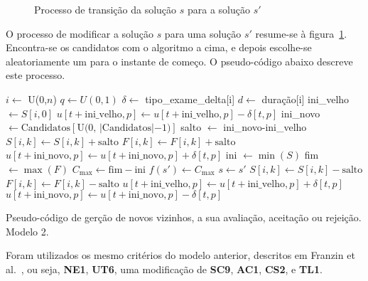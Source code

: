 \begin{figure}[H]
	\centering
	\caption{Processo de transição da solução $s$ para a solução $s'$}
	\label{fig:trans_P1M1_GV}
\end{figure}
O processo de modificar a solução $s$ para uma solução $s'$ resume-se à figura~\ref{fig:trans_P1M1_GV}. Encontra-se os candidatos com o algoritmo a cima, e depois escolhe-se aleatoriamente um para o instante de começo. O pseudo-código abaixo descreve este processo.\\
\begin{algorithm}[H]
    $i \gets$ U(0,$n$)\;
    $q \gets U(0,1)$\;
    $\delta \gets$ tipo\_exame\_delta[i]\;
    $d \gets$ duração[i]\;
    ini\_velho $\gets S[i, 0]$\;
	{
    	{
		$u[t+\text{ini\_velho}, p] \gets u[t+\text{ini\_velho}, p] - \delta[t, p]$\;
    	}
	}
	ini\_novo $\gets \text{Candidatos}[\text{U(0, |Candidatos}|-1)]$\;
    salto $\gets$ ini\_novo-ini\_velho\;
    {
    $S[i, k] \gets S[i, k]+ \text{salto}$\;
    $F[i, k] \gets F[i, k]+ \text{salto}$\;
    }
	{
    	{
		$u[t+\text{ini\_novo}, p] \gets u[t+\text{ini\_novo}, p] + \delta[t, p]$\;
    	}
	}
    ini $\gets \min(S)$\;
    fim $\gets \max(F)$\;
    $C_{\max} \gets \text{fim} - \text{ini}$\;
    $f(s') \gets C_{\max}$\;
	{
		$s \gets s'$
	}
	\Else
	{
    {
    $S[i, k] \gets S[i, k]- \text{salto}$\;
    $F[i, k] \gets F[i, k]- \text{salto}$\;
    }
	{
    	{
		$u[t+\text{ini\_velho}, p] \gets u[t+\text{ini\_velho}, p] + \delta[t, p]$\;
		$u[t+\text{ini\_novo}, p] \gets u[t+\text{ini\_novo}, p] - \delta[t, p]$\;
    	}
	}
	}
    \caption{Pseudo-código de gerção de novos vizinhos, a sua avaliação, aceitação ou rejeição. Modelo 2.}
\end{algorithm}

Foram utilizados os mesmo critérios do modelo anterior, descritos em Franzin et al.~\cite{franzinRevisitingSimulatedAnnealing2019}, ou seja, \textbf{NE1}, \textbf{UT6}, uma modificação de \textbf{SC9}, \textbf{AC1}, \textbf{CS2}, e \textbf{TL1}.\\

